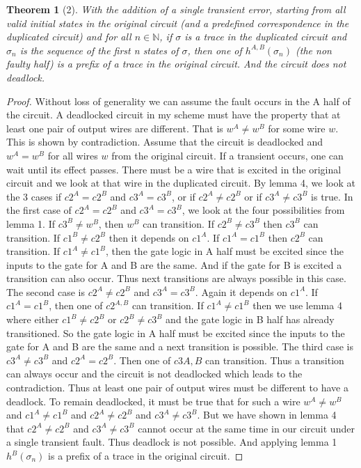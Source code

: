 \documentclass{article}
\newtheorem*{theorem}{Theorem}
\begin{document}
\begin{theorem}[2]
With the addition of a single transient error, starting from all valid initial states in the original circuit (and a predefined correspondence in the duplicated circuit) and for all $n \in \mathbb{N}$, if $\sigma$ is a trace in the duplicated circuit and $\sigma_n$ is the sequence of the first n states of $\sigma$, then one of $h^{A,B}(\sigma_n)$ (the non faulty half) is a prefix of a trace in the original circuit.  And the circuit does not deadlock.  
\end{theorem}
\begin{proof}
Without loss of generality we can assume the fault occurs in the A half of the circuit. 
A deadlocked circuit in my scheme must have the property that at least one pair of output wires are different.  That is $w^A\neq w^B$ for some wire $w$.
This is shown by contradiction.  Assume that the circuit is deadlocked and $w^A = w^B$ for all wires $w$ from the original circuit.  If a transient occurs, one can wait until its effect passes.  There
 must be a wire that is excited in the original circuit and we look at that wire in the duplicated circuit. By lemma 4, we look at the 3 cases if $c2^A=c2^B$ and $c3^A=c3^B$, or if $c2^A\neq c2^B$ or if $c3^A\neq c3^B$ is true.  \newline
In the first case of $c2^A=c2^B$ and $c3^A=c3^B$, we look at the four possibilities from lemma 1.  If $c3^B\neq w^B$, then $w^B$ can transition.  If $c2^B\neq c3^B$ then $c3^B$ can transition.  If $c1^B\neq c2^B$ then it depends on $c1^A$.  If $c1^A=c1^B$ then $c2^B$ can transition.  If $c1^A\neq c1^B$, then the gate logic in A half must be excited since the inputs to the gate for A and B are the same.  And if the gate for B is excited a transition can also occur.  Thus next transitions are always possible in this case.\newline
The second case is  $c2^A\neq c2^B$ and $c3^A=c3^B$.  Again it depends on $c1^A$.  If $c1^A=c1^B$, then one of $c2^{A,B}$ can transition.  If $c1^A\neq c1^B$ then we use lemma 4 where either $c1^B \neq c2^B$ or $c2^B \neq c3^B$ and the gate logic in B half has already transitioned.  So the gate logic in A half must be excited since the inputs to the gate for A and B are the same and a next transition is possible.\newline
The third case is  $c3^A\neq c3^B$ and $c2^A=c2^B$.  Then one of $c3{A,B}$ can transition.\newline
Thus a transition can always occur and the circuit is not deadlocked which leads to the contradiction.  Thus at least one pair of output wires must be different to have a deadlock. To remain deadlocked, it must be true that for such a wire $w^A\neq w^B$ and $c1^A\neq c1^B$ and $c2^A\neq c2^B$ and $c3^A\neq c3^B$.  But we have shown in lemma 4 that $c2^A\neq c2^B$ and $c3^A\neq c3^B$ cannot occur at the same time in our circuit under a single transient fault. Thus deadlock is not possible.  And applying lemma 1 $h^B(\sigma_n)$ is a prefix of a trace in the original circuit. 
\end{proof}
\end{document}
